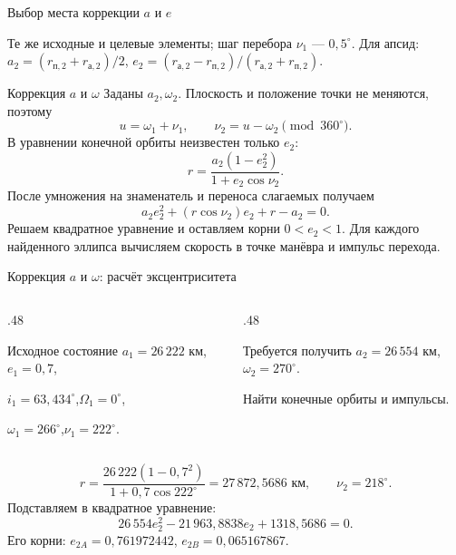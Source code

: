 \documentclass[11pt,aspectratio=169,t]{beamer}
\begin{document}
\begin{frame}{Выбор места коррекции $a$ и $e$}
\centering\par
\smallskip\raggedright
Те же исходные и целевые элементы; шаг перебора $\nu_1$ --- $0{,}5^\circ$.\newline
Для апсид: $a_2=(r_{\text{п},2}+r_{\text{а},2})/2$,\quad
$e_2=(r_{\text{а},2}-r_{\text{п},2})/(r_{\text{а},2}+r_{\text{п},2})$.
\end{frame}

\begin{frame}{Коррекция $a$ и $\omega$}
Заданы $a_2,\omega_2$. Плоскость и положение точки не меняются, поэтому
\[
u=\omega_1+\nu_1,\qquad \nu_2=u-\omega_2\pmod{360^\circ}.
\]
В уравнении конечной орбиты неизвестен только $e_2$:
\[
r=\frac{a_2(1-e_2^2)}{1+e_2\cos\nu_2}.
\]
После умножения на знаменатель и переноса слагаемых получаем
\[
\boxed{a_2e_2^2+(r\cos\nu_2)e_2+r-a_2=0.}
\]
\justifying
Решаем квадратное уравнение и оставляем корни $0<e_2<1$.
Для каждого найденного эллипса вычисляем скорость в точке манёвра
и импульс перехода.
\end{frame}

\begin{frame}{Коррекция $a$ и $\omega$: расчёт эксцентриситета}
\begin{columns}[T,onlytextwidth]
\begin{column}{.48\textwidth}
\begin{block}{Исходное состояние}
$a_1=26\,222$ км,\quad $e_1=0{,}7$,\par
$i_1=63{,}434^\circ$,\quad $\Omega_1=0^\circ$,\par
$\omega_1=266^\circ$,\quad $\nu_1=222^\circ$.
\end{block}
\end{column}
\begin{column}{.48\textwidth}
\begin{block}{Требуется получить}
$a_2=26\,554$ км,\quad $\omega_2=270^\circ$.
\par\medskip
Найти конечные орбиты и импульсы.
\end{block}
\end{column}
\end{columns}
\[
r=\frac{26\,222(1-0{,}7^2)}{1+0{,}7\cos222^\circ}=27\,872{,}5686\text{ км},
\qquad \nu_2=218^\circ.
\]
Подставляем в квадратное уравнение:
\[
26\,554e_2^2-21\,963{,}8838e_2+1318{,}5686=0.
\]
Его корни: $e_{2A}=0{,}761972442$, $e_{2B}=0{,}065167867$.
\end{frame}
\end{document}
